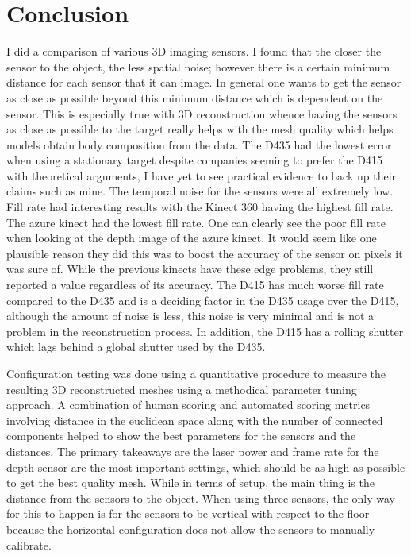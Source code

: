 \chapter{Conclusion}

I did a comparison of various 3D imaging sensors. I found that the closer the sensor to the object, the less spatial noise; however there is a certain minimum distance for each sensor that it can image. In general one wants to get the sensor as close as possible beyond this minimum distance which is dependent on the sensor. This is especially true with 3D reconstruction whence having the sensors as close as possible to the target really helps with the mesh quality which helps models obtain body composition from the data. The D435 had the lowest error when using a stationary target despite companies seeming to prefer the D415 with theoretical arguments, I have yet to see practical evidence to back up their claims such as mine. The temporal noise for the sensors were all extremely low. Fill rate had interesting results with the Kinect 360 having the highest fill rate. The azure kinect had the lowest fill rate. One can clearly see the poor fill rate when looking at the depth image of the azure kinect. It would seem like one plausible reason they did this was to boost the accuracy of the sensor on pixels it was sure of. While the previous kinects have these edge problems, they still reported a value regardless of its accuracy. The D415 has much worse fill rate compared to the D435 and is a deciding factor in the D435 usage over the D415, although the amount of noise is less, this noise is very minimal and is not a problem in the reconstruction process. In addition, the D415 has a rolling shutter which lags behind a global shutter used by the D435.

Configuration testing was done using a quantitative procedure to measure the resulting 3D reconstructed meshes using a methodical parameter tuning approach. A combination of human scoring and automated scoring metrics involving distance in the euclidean space along with the number of connected components helped to show the best parameters for the sensors and the distances. The primary takeaways are the laser power and frame rate for the depth sensor are the most important settings, which should be as high as possible to get the best quality mesh. While in terms of setup, the main thing is the distance from the sensors to the object. When using three sensors, the only way for this to happen is for the sensors to be vertical with respect to the floor because the horizontal configuration does not allow the sensors to manually calibrate. 

